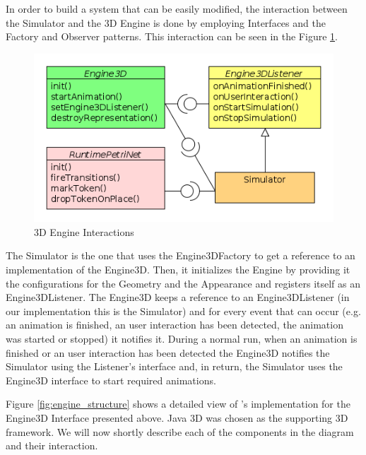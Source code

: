 In order to build a system that can be easily modified, the interaction between the Simulator and
the 3D Engine is done by employing Interfaces and the Factory and Observer patterns. This
interaction can be seen in the Figure \ref{fig:engine_relations}.

\begin{figure}[ht]
   \begin{center}
       \includegraphics[scale=0.50]{image/engine_relations.png}
       \caption{3D Engine Interactions}
       \label{fig:engine_relations}
       \end{center}
   \end{figure}

The Simulator is the one that uses the Engine3DFactory to get a reference to an implementation of
the Engine3D. Then, it initializes the Engine by providing it the configurations for the Geometry
and the Appearance and registers itself as an Engine3DListener. The Engine3D keeps a reference to an
Engine3DListener (in our implementation this is the Simulator) and for every event that can occur
(e.g. an animation is finished, an user interaction has been detected, the animation was started or
stopped) it notifies it. During a normal run, when an animation is finished or an user interaction
has been detected the Engine3D notifies the Simulator using the Listener's interface and, in return,
the Simulator uses the Engine3D interface to start required animations.

Figure \ref{fig:engine_structure} shows a detailed view of \epns's implementation for the Engine3D
Interface presented above. Java 3D was chosen as the supporting 3D framework. We will now shortly
describe each of the components in the diagram and their interaction.
 
